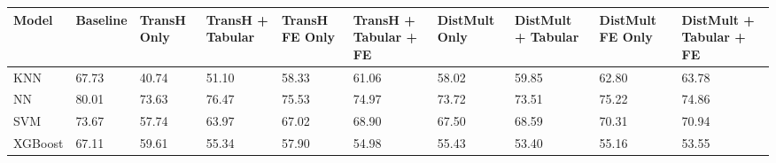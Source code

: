 \begin{tabular}{llllllllll}
\toprule
Model & Baseline & TransH Only & TransH + Tabular & TransH FE Only & TransH + Tabular + FE & DistMult Only & DistMult + Tabular & DistMult FE Only & DistMult + Tabular + FE \\
\midrule
KNN & 67.73 & 40.74 & 51.10 & 58.33 & 61.06 & 58.02 & 59.85 & 62.80 & 63.78 \\
NN & 80.01 & 73.63 & 76.47 & 75.53 & 74.97 & 73.72 & 73.51 & 75.22 & 74.86 \\
SVM & 73.67 & 57.74 & 63.97 & 67.02 & 68.90 & 67.50 & 68.59 & 70.31 & 70.94 \\
XGBoost & 67.11 & 59.61 & 55.34 & 57.90 & 54.98 & 55.43 & 53.40 & 55.16 & 53.55 \\
\bottomrule
\end{tabular}
